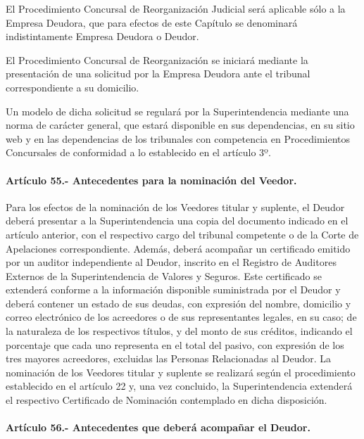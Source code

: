 \documentclass[
]{book}
\begin{document}
El Procedimiento Concursal de Reorganización Judicial será aplicable sólo a la Empresa Deudora, que para efectos de este Capítulo se denominará indistintamente Empresa Deudora o Deudor.

El Procedimiento Concursal de Reorganización se iniciará mediante la presentación de una solicitud por la Empresa Deudora ante el tribunal correspondiente a su domicilio.

Un modelo de dicha solicitud se regulará por la Superintendencia mediante una norma de carácter general, que estará disponible en sus dependencias, en su sitio web y en las dependencias de los tribunales con competencia en Procedimientos Concursales de conformidad a lo establecido en el artículo 3º.

\hypertarget{artuxedculo-55.--antecedentes-para-la-nominaciuxf3n-del-veedor.}{%
\paragraph*{Artículo 55.- Antecedentes para la nominación del Veedor.}\label{artuxedculo-55.--antecedentes-para-la-nominaciuxf3n-del-veedor.}}

Para los efectos de la nominación de los Veedores titular y suplente, el Deudor deberá presentar a la Superintendencia una copia del documento indicado en el artículo anterior, con el respectivo cargo del tribunal competente o de la Corte de Apelaciones correspondiente. Además, deberá acompañar un certificado emitido por un auditor independiente al Deudor, inscrito en el Registro de Auditores Externos de la Superintendencia de Valores y Seguros. Este certificado se extenderá conforme a la información disponible suministrada por el Deudor y deberá contener un estado de sus deudas, con expresión del nombre, domicilio y correo electrónico de los acreedores o de sus representantes legales, en su caso; de la naturaleza de los respectivos títulos, y del monto de sus créditos, indicando el porcentaje que cada uno representa en el total del pasivo, con expresión de los tres mayores acreedores, excluidas las Personas Relacionadas al Deudor. La nominación de los Veedores titular y suplente se realizará según el procedimiento establecido en el artículo 22 y, una vez concluido, la Superintendencia extenderá el respectivo Certificado de Nominación contemplado en dicha disposición.

\hypertarget{artuxedculo-56.--antecedentes-que-deberuxe1-acompauxf1ar-el-deudor.}{%
\paragraph*{Artículo 56.- Antecedentes que deberá acompañar el Deudor.}\label{artuxedculo-56.--antecedentes-que-deberuxe1-acompauxf1ar-el-deudor.}}
\end{document}
